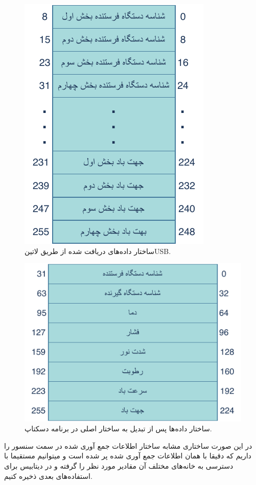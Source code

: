 \begin{figure}[H]
	\centering
	\includegraphics[width=0.4\linewidth]{Assets/loraData.pdf}
	\caption{ساختار داده‌های دریافت شده از طریق ‌لاتین{USB}.}
	\label{fig:USBDataReceive}
\end{figure}

\begin{figure}[H]
	\centering
	\includegraphics[width=0.6\linewidth]{Assets/sensorData.pdf}
	\caption{ساختار داده‌ها پس از تبدیل به ساختار اصلی در برنامه دسکتاپ.}
	\label{fig:USBDataConverted}
\end{figure}

در این صورت ساختاری مشابه ساختار اطلاعات جمع آوری شده در سمت سنسور را داریم که دقیقا با همان اطلاعات جمع آوری شده پر شده است و میتوانیم مستقیما با دسترسی به خانه‌های مختلف آن مقادیر مورد نظر را گرفته و در دیتابیس برای استفاده‌های بعدی ذخیره کنیم.
